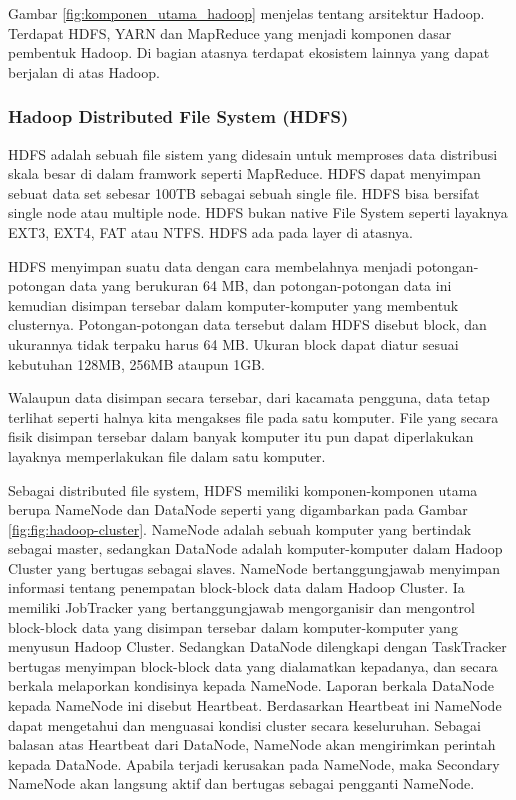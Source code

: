 Gambar \ref{fig:komponen_utama_hadoop} menjelas tentang arsitektur Hadoop. Terdapat HDFS, YARN dan MapReduce yang menjadi komponen dasar pembentuk Hadoop. Di bagian atasnya terdapat ekosistem lainnya yang dapat berjalan di atas Hadoop.

\subsubsection{Hadoop Distributed File System (HDFS)}
HDFS adalah sebuah file sistem yang didesain untuk memproses data distribusi skala besar di dalam framwork seperti MapReduce. HDFS dapat menyimpan sebuat data set sebesar 100TB sebagai sebuah single file.\cite{Lam:2010:HA:1965594} HDFS bisa bersifat single node atau multiple node. HDFS bukan native File System seperti layaknya EXT3, EXT4, FAT atau NTFS. HDFS ada pada layer di atasnya.

HDFS menyimpan suatu data dengan cara membelahnya menjadi potongan-potongan data yang berukuran 64 MB, dan potongan-potongan data ini kemudian disimpan tersebar dalam komputer-komputer yang membentuk clusternya. Potongan-potongan data tersebut dalam HDFS disebut block, dan ukurannya tidak terpaku harus 64 MB. Ukuran block dapat diatur sesuai kebutuhan 128MB, 256MB ataupun 1GB.

Walaupun data disimpan secara tersebar, dari kacamata pengguna, data tetap terlihat seperti halnya kita mengakses file pada satu komputer. File yang secara fisik disimpan tersebar dalam banyak komputer itu pun dapat diperlakukan layaknya memperlakukan file dalam satu komputer.

Sebagai distributed file system, HDFS memiliki komponen-komponen utama berupa NameNode dan DataNode seperti yang digambarkan pada Gambar \ref{fig:fig:hadoop-cluster}. NameNode adalah sebuah komputer yang bertindak sebagai master, sedangkan DataNode adalah komputer-komputer dalam Hadoop Cluster yang bertugas sebagai slaves. NameNode bertanggungjawab menyimpan informasi tentang penempatan block-block data dalam Hadoop Cluster. Ia memiliki JobTracker yang bertanggungjawab mengorganisir dan mengontrol block-block data yang disimpan tersebar dalam komputer-komputer yang menyusun Hadoop Cluster. Sedangkan DataNode dilengkapi dengan TaskTracker bertugas menyimpan block-block data yang dialamatkan kepadanya, dan secara berkala melaporkan kondisinya kepada NameNode. Laporan berkala DataNode kepada NameNode ini disebut Heartbeat. Berdasarkan Heartbeat ini NameNode dapat mengetahui dan menguasai kondisi cluster secara keseluruhan. Sebagai balasan atas Heartbeat dari DataNode, NameNode akan mengirimkan perintah kepada DataNode. Apabila terjadi kerusakan pada NameNode, maka Secondary NameNode akan langsung aktif dan bertugas sebagai pengganti NameNode.

